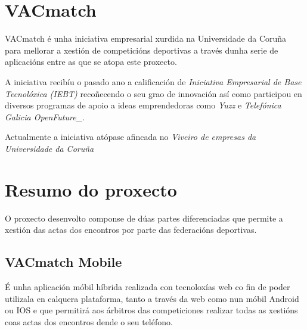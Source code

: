     \section{VACmatch}

    VACmatch é unha iniciativa empresarial xurdida na Universidade da Coruña para 
mellorar a xestión de competicións deportivas a través dunha serie de 
aplicacións entre as que se atopa este proxecto.

    A iniciativa recibíu o pasado ano a calificación de \emph{Iniciativa Empresarial de 
Base Tecnolóxica (IEBT)} recoñecendo o seu grao de innovación así como participou en 
diversos programas de apoio a ideas emprendedoras como \emph{Yuzz} e \emph{Telefónica 
Galicia OpenFuture\_}.

   Actualmente a iniciativa atópase afincada no \emph{Viveiro de empresas da Universidade 
da Coruña}

    \section{Resumo do proxecto}
    O proxecto desenvolto componse de dúas partes diferenciadas que permite a 
xestión das actas dos encontros por parte das federacións deportivas.
    
    \subsection{VACmatch Mobile}
    É unha aplicación móbil híbrida realizada con tecnoloxías web co fin de 
poder utilizala en calquera plataforma, tanto a través da web como nun móbil 
Android ou IOS e que permitirá aos árbitros das competiciones realizar 
todas as xestións coas actas dos encontros dende o seu teléfono.

